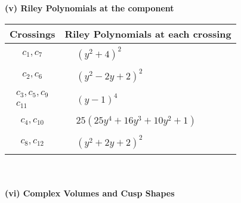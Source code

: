 \documentclass[1p]{elsarticle_modified}
\theoremstyle{definition}
\begin{document}
\newpage\renewcommand{\arraystretch}{1}
\flushleft \textbf{(v) Riley Polynomials at the component}\newline \\
\begin{tabular}{m{50pt}|m{274pt}}
Crossings & \hspace{64pt}Riley Polynomials at each crossing \\
\hline $$\begin{aligned}c_{1},c_{7}\end{aligned}$$&$\begin{aligned}
&(y^2+4)^2
\end{aligned}$\\
\hline $$\begin{aligned}c_{2},c_{6}\end{aligned}$$&$\begin{aligned}
&(y^2-2 y+2)^2
\end{aligned}$\\
\hline $$\begin{aligned}c_{3},c_{5},c_{9}\\c_{11}\end{aligned}$$&$\begin{aligned}
&(y-1)^4
\end{aligned}$\\
\hline $$\begin{aligned}c_{4},c_{10}\end{aligned}$$&$\begin{aligned}
&25(25 y^4+16 y^3+10 y^2+1)
\end{aligned}$\\
\hline $$\begin{aligned}c_{8},c_{12}\end{aligned}$$&$\begin{aligned}
&(y^2+2 y+2)^2
\end{aligned}$\\
\hline
\end{tabular}\\~\\
\newpage\flushleft \textbf{(vi) Complex Volumes and Cusp Shapes}
\end{document}
